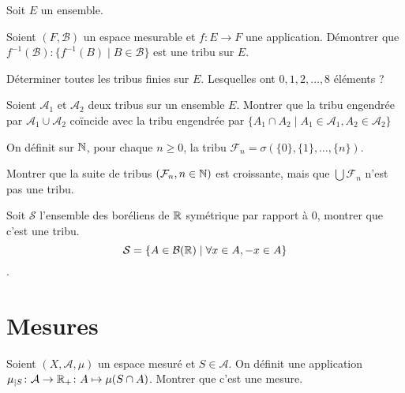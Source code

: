 \documentclass[french]{report}
\begin{document}
\begin{exo}
    Soit \(E\) un ensemble.
    \begin{q}{1}
        Soient \(\left(F, \mathcal{B}\right)\) un espace mesurable et
        \(f\colon E\to F\) une application. Démontrer que \(f^{-1}(\mathcal{B})
        \colon\{f^{-1}(B)\mid B\in\mathcal{B}\}\) est une tribu sur \(E\).
    \end{q}
    \begin{q}{2}
        Déterminer toutes les tribus finies sur \(E\). Lesquelles ont
        \(0,1,2,\dots,8\) éléments ?
    \end{q}
\end{exo}

\begin{exo}
    Soient \(\mathcal{A}_1\) et \(\mathcal{A}_2\) deux tribus sur un ensemble \(E\).
    Montrer que la tribu engendrée par \(\mathcal{A}_1\cup\mathcal{A}_2\) coïncide
    avec la tribu engendrée par \(\{A_1\cap A_2\mid A_1\in\mathcal{A}_1, A_2\in\mathcal{A}_2\}\)
\end{exo}

\begin{exo}
    On définit sur \(\mathbb{N}\), pour chaque \(n\geq 0\), la tribu \(\mathcal{F}_n=
    \sigma\left(\{0\},\{1\},\dots,\{n\}\right)\).
    \begin{q}{1}
        Montrer que la suite de tribus \(\left(\mathcal{F}_n,n\in\mathbb{N}\right)\) est
        croissante, mais que \(\bigcup \mathcal{F}_n\) n'est pas une tribu.
    \end{q}
\end{exo}

\begin{exo}
    Soit \(\mathcal{S}\) l'ensemble des boréliens de \(\mathbb{R}\) symétrique par
    rapport à \(0\), montrer que c'est une tribu. \[\mathcal{S}=\{A\in\mathcal{B}(\mathbb{R})\mid \forall x\in A, -x\in A\}\].
\end{exo}

\section*{Mesures}

\begin{exo}
    Soient \(\left(X,\mathcal{A},\mu\right)\) un espace mesuré et \(S\in \mathcal{A}\).
    On définit une application \(\mu_{\mid S}\colon \mathcal{A}\to \mathbb{R}_+\colon A\mapsto \mu(S\cap A)\).
    Montrer que c'est une mesure.
\end{exo}
\end{document}
